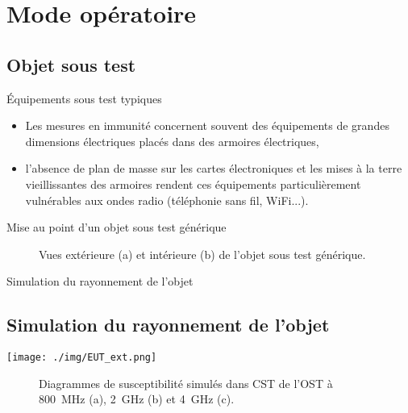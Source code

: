 \documentclass[]{beamer}
\begin{document}
\section{Mode opératoire}
\subsection{Objet sous test}
\begin{frame}{Équipements sous test typiques}
\begin{itemize}
    \item Les mesures en immunité concernent souvent des équipements de grandes dimensions électriques placés dans des armoires électriques,
    \item l'absence de plan de masse sur les cartes électroniques et les mises à la terre vieillissantes des armoires rendent ces équipements particulièrement vulnérables aux ondes radio (téléphonie sans fil, WiFi...).
    \end{itemize}

\end{frame}
\begin{frame}{Mise au point d'un objet sous test générique}
\begin{figure}[t]
     \centering
     \caption{Vues extérieure (a) et intérieure (b) de l'objet sous test générique.}
     \label{fig_diags}
\end{figure}
\vspace{-0.2cm}
\end{frame}
\begin{frame}{Simulation du rayonnement de l'objet}
\subsection{Simulation du rayonnement de l'objet}
     \centering  
          \texttt{[image: ./img/EUT\_ext.png]}
\vspace{-0.8cm}
\begin{figure}[t]
     \centering
     \caption{Diagrammes de susceptibilité simulés dans CST de l'OST à 800~MHz (a), 2~GHz (b) et 4~GHz (c).}
     \label{fig_diagsCST}
\end{figure}
\end{frame}
\end{document}
